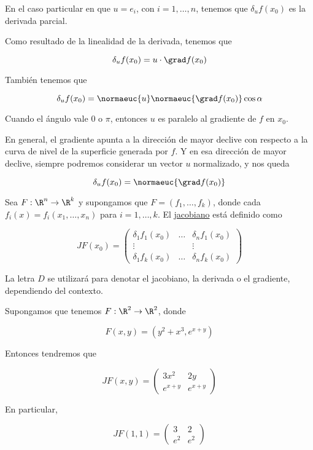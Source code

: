 En el caso particular en que $u = e_i$, con $i = 1, \dots, n$, tenemos que $\delta_u f(x_0)$ es la derivada parcial.

\begin{prop}
    Como resultado de la linealidad de la derivada, tenemos que
    
    \[
    \delta_u f(x_0) = u \cdot \grad f(x_0)
    \]
    
    También tenemos que
    
    \[
    \delta_u f(x_0) = \normaeuc{u} \normaeuc{\grad f(x_0)} \cos \alpha
    \]
    
    Cuando el ángulo vale $0$ o $\pi$, entonces $u$ es paralelo al gradiente de $f$ en $x_0$.
    
    En general, el gradiente apunta a la dirección de mayor declive con respecto a la curva de nivel de la superficie generada por $f$. Y en esa dirección de mayor declive, siempre podremos considerar un vector $u$ normalizado, y nos queda
    
    \[
    \delta_u f(x_0) = \normaeuc{\grad f(x_0)}
    \]
\end{prop}

\begin{defn}
    Sea $F: \R^n \rightarrow \R^k$ y supongamos que $F = (f_1, \dots, f_k)$, donde cada $f_i(x) = f_i(x_1, \dots, x_n)$ para $i = 1, \dots, k$. El \ul{jacobiano} está definido como
    
    \[
    JF(x_0) =
    \begin{pmatrix}
        \delta_1 f_1(x_0) & \dots & \delta_n f_1(x_0) \\
        \vdots & & \vdots \\
        \delta_1 f_k(x_0) & \dots & \delta_n f_k(x_0)
    \end{pmatrix}
    \]
\end{defn}

\begin{nota}
    La letra $D$ se utilizará para denotar el jacobiano, la derivada o el gradiente, dependiendo del contexto.
\end{nota}

\begin{ejem}
    Supongamos que tenemos $F: \R^2 \rightarrow \R^2$, donde
    
    \[
    F(x, y) = \left( y^2 + x^3, e^{x+y} \right)
    \]
    
    Entonces tendremos que
    
    \[
    JF(x,y) =
    \begin{pmatrix}
        3x^2    & 2y \\
        e^{x+y} & e^{x+y}
    \end{pmatrix}
    \]
    
    En particular,
    
    \[
    JF(1,1) =
    \begin{pmatrix}
        3   & 2 \\
        e^2 & e^2
    \end{pmatrix}
    \]
\end{ejem}

